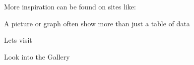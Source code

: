 \documentclass[Screen16to9,17pt]{foils}
\begin{document}
More inspiration can be found on sites like:

A picture or graph often show more than just a table of data




\begin{list2}
  \item Lets visit 
  \item Look into the Gallery
\end{list2}




\slidenext
\end{document}
